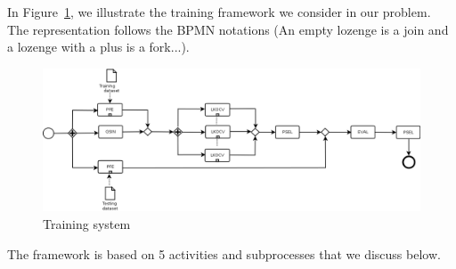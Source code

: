 \documentclass[10pt, conference, compsocconf]{IEEEtran}
\begin{document}
In Figure~\ref{fig:training}, we illustrate the training framework we consider in our problem. The representation follows the 
BPMN notations (An empty lozenge is a join and a lozenge with a plus is a fork...). 

\begin{figure}[htbp]
  \captionsetup{aboveskip=-5pt}
	\centering
	\includegraphics[scale=0.3]{./Figures/workflow.png}
	\caption{Training system}
	\label{fig:training}
	\end{figure}

The framework is based on 5 activities and subprocesses that we discuss below.
\end{document}
